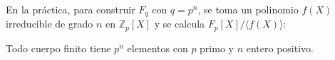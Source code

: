 En la práctica, para construir $F_q$ con $q = p^n$, se toma un polinomio $f(X)$ irreducible de grado $n$ en $\mathbb{Z}_p[X]$ y se calcula $F_p[X] / \langle f(X) \rangle$:

\begin{thm}
	Todo cuerpo finito tiene $p^n$ elementos con $p$ primo y $n$ entero positivo.
%	
\end{thm}

